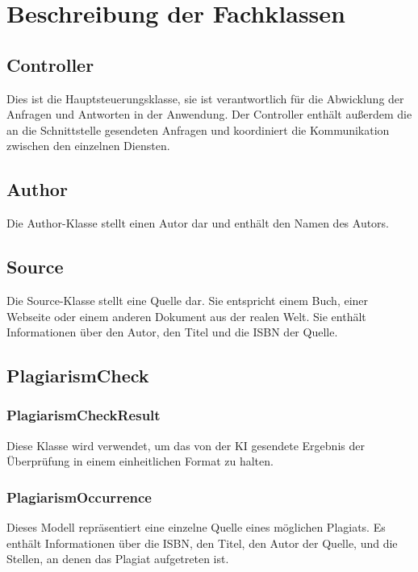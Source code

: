 \section{Beschreibung der Fachklassen}\label{sec:beschreibung_der_fachklassen}

\subsection{Controller}\label{subsec:controller}
Dies ist die Hauptsteuerungsklasse,
sie ist verantwortlich für die Abwicklung der Anfragen und Antworten in der Anwendung.
Der Controller enthält außerdem die an die Schnittstelle gesendeten Anfragen und koordiniert die Kommunikation zwischen den einzelnen Diensten.

\subsection{Author}\label{subsec:author}
Die Author-Klasse stellt einen Autor dar und enthält den Namen des Autors.

\subsection{Source}\label{subsec:source}
Die Source-Klasse stellt eine Quelle dar.
Sie entspricht einem Buch, einer Webseite oder einem anderen Dokument aus der realen Welt.
Sie enthält Informationen über den Autor, den Titel und die ISBN der Quelle.

\subsection{PlagiarismCheck}\label{subsec:plagiarism_check}

\subsubsection{PlagiarismCheckResult}\label{subsubsec:plagiarism_check_result}
Diese Klasse wird verwendet, um das von der KI gesendete Ergebnis der Überprüfung in einem einheitlichen Format zu halten.

\subsubsection{PlagiarismOccurrence}\label{subsubsec:plagiarism_occurrence}
Dieses Modell repräsentiert eine einzelne Quelle eines möglichen Plagiats.
Es enthält Informationen über die ISBN, den Titel,
den Autor der Quelle, und die Stellen, an denen das Plagiat aufgetreten ist.

